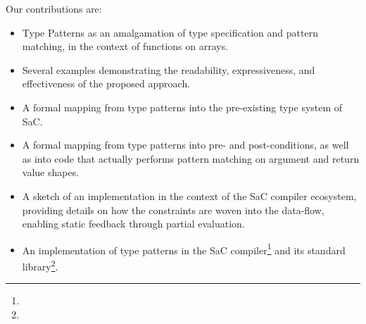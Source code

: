 Our contributions are:
\begin{itemize}
    \item Type Patterns as an amalgamation of type specification and pattern matching, in the context of functions on arrays.
    \item Several examples demonstrating the readability, expressiveness, and effectiveness of the proposed approach.
    \item A formal mapping from type patterns into the pre-existing type system of SaC.
    \item A formal mapping from type patterns into pre- and post-conditions, as well as into code that actually performs pattern matching on argument and return value shapes.
    \item A sketch of an implementation in the context of the SaC compiler ecosystem, providing details on how the constraints are woven into the data-flow, enabling static feedback through partial evaluation.
    \item An implementation of type patterns in the SaC compiler\footnote{\sachome} and its standard library\footnote{\stdlib}.
\end{itemize}
